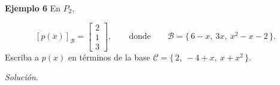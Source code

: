 \begin{frame}%


\begin{ej}{\textbf{Ejemplo 6}}
	En $P_2$,
	
	\vspace{-2mm}
	\[
	\left[ p(x) \right]_{\mathcal{B}} = 
	\left[
	\begin{array}{c}
	2\\
	1\\
	3
	\end{array}
	\right],
	\qquad \text{donde} \qquad
	\mathcal{B} = \Big\{ \, 6-x, \ 3x,\ x^2-x-2 \, \Big\}.
	\]
	Escriba a $p(x)$ en términos de la base $\mathcal{C} = \Big\{ \, 2, \ -4+x,\ x+x^2 \, \Big\}$.
	
\end{ej}
\textit{Solución}.

\end{frame}